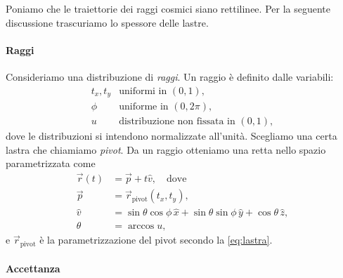 Poniamo che le traiettorie dei raggi cosmici siano rettilinee.
Per la seguente discussione trascuriamo lo spessore delle lastre.

\paragraph{Raggi}

Consideriamo una distribuzione di \emph{raggi}.
Un raggio è definito dalle variabili:
\begin{equation}
	\label{eq:raggio}
	\begin{array}{ll}
		t_x, t_y & \text{uniformi in $(0,1)$}, \\
		\phi     & \text{uniforme in $(0,2\pi)$}, \\
		u        & \text{distribuzione non fissata in $(0,1)$},
	\end{array}
\end{equation}
dove le distribuzioni si intendono normalizzate all'unità.
Scegliamo una certa lastra che chiamiamo \emph{pivot}.
Da un raggio otteniamo una retta nello spazio parametrizzata come
\begin{align*}
	\vec r(t) &= \vec p + t \hat v, \quad \text{dove} \\
	\vec p    &= \vec r_\text{pivot}(t_x, t_y), \\
	\hat v    &= \sin\theta\cos\phi\,\hat x + \sin\theta\sin\phi\,\hat y + \cos\theta\,\hat z, \\
	\theta    &= \arccos u,
\end{align*}
e $\vec r_\text{pivot}$ è la parametrizzazione del pivot secondo la \eqref{eq:lastra}.

\paragraph{Accettanza}

